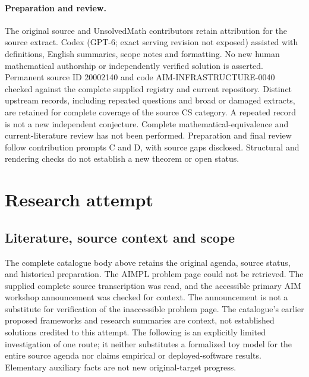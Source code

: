 \documentclass[11pt]{article}
\begin{document}
\paragraph{Preparation and review.}
The original source and UnsolvedMath contributors retain attribution for the source extract. Codex (GPT-6; exact serving revision not exposed) assisted with definitions, English summaries, scope notes and formatting. No new human mathematical authorship or independently verified solution is asserted. Permanent source ID 20002140 and code AIM-INFRASTRUCTURE-0040 checked against the complete supplied registry and current repository. Distinct upstream records, including repeated questions and broad or damaged extracts, are retained for complete coverage of the source CS category. A repeated record is not a new independent conjecture. Complete mathematical-equivalence and current-literature review has not been performed. Preparation and final review follow contribution prompts C and D, with source gaps disclosed. Structural and rendering checks do not establish a new theorem or open status.
\label{end:20002140}

\section{Research attempt}
\subsection{Literature, source context and scope}
The complete catalogue body above retains the original agenda, source status, and historical preparation. The AIMPL problem page could not be retrieved. The supplied complete source transcription was read, and the accessible primary AIM workshop announcement was checked for context. The announcement is not a substitute for verification of the inaccessible problem page. The catalogue's earlier proposed frameworks and research summaries are context, not established solutions credited to this attempt. The following is an explicitly limited investigation of one route; it neither substitutes a formalized toy model for the entire source agenda nor claims empirical or deployed-software results. Elementary auxiliary facts are not new original-target progress.
\end{document}
